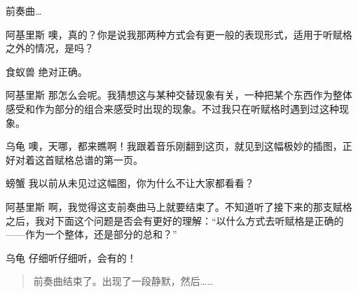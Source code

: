 \begin{dialog}{前奏曲…}
\begin{dialogue}
\item[阿基里斯]噢，真的？你是说我那两种方式会有更一般的表现形式，适用于听赋格之外的情况，是吗？

\item[食蚁兽]绝对正确。

\item[阿基里斯]那怎么会呢。我猜想这与某种交替现象有关，一种把某个东西作为整体感受和作为部分的组合来感受时出现的现象。不过我只在听赋格时遇到过这种现象。

\item[乌龟]噢，天哪，都来瞧啊！我跟着音乐刚翻到这页，就见到这幅极妙的插图，正好对着这首赋格总谱的第一页。

\item[螃蟹]我以前从未见过这幅图，你为什么不让大家都看看？


\item[阿基里斯]啊，我觉得这支前奏曲马上就要结束了。不知道听了接下来的那支赋格之后，我对下面这个问题是否会有更好的理解：“以什么方式去听赋格是正确的——作为一个整体，还是部分的总和？”

\item[乌龟]仔细听仔细听，会有的！

\end{dialogue}

\begin{quote}
前奏曲结束了。出现了一段静默，然后……
\end{quote}

\begin{flushright}
\hyperref[dialog:ant-fugue]{\lnote{[紧接下段]}}
\end{flushright}

\end{dialog}
